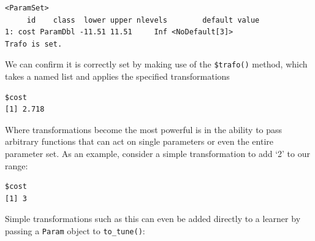 \begin{verbatim}
<ParamSet>
     id    class  lower upper nlevels        default value
1: cost ParamDbl -11.51 11.51     Inf <NoDefault[3]>      
Trafo is set.
\end{verbatim}

We can confirm it is correctly set by making use of the
\texttt{\$trafo()} method, which takes a named list and applies the
specified transformations

\begin{Shaded}
\begin{Highlighting}[]
\SpecialCharTok{$}\NormalTok{(}\NormalTok{(} \NormalTok{))}
\end{Highlighting}
\end{Shaded}

\begin{verbatim}
$cost
[1] 2.718
\end{verbatim}

Where transformations become the most powerful is in the ability to pass
arbitrary functions that can act on single parameters or even the entire
parameter set. As an example, consider a simple transformation to add
`2' to our range:

\begin{Shaded}
\begin{Highlighting}[]
\OtherTok{=} \NormalTok{(} \NormalTok{(}\NormalTok{, }\NormalTok{, } \SpecialCharTok{+} \NormalTok{))}
\SpecialCharTok{$}\NormalTok{(}\NormalTok{(} \NormalTok{))}
\end{Highlighting}
\end{Shaded}

\begin{verbatim}
$cost
[1] 3
\end{verbatim}

Simple transformations such as this can even be added directly to a
learner by passing a \texttt{Param} object to \texttt{to\_tune()}:

\begin{Shaded}
\begin{Highlighting}[]
\NormalTok{(}\NormalTok{,}
   \NormalTok{(}\NormalTok{(}\NormalTok{, }\NormalTok{, } \SpecialCharTok{+} \NormalTok{)))}
\end{Highlighting}
\end{Shaded}

